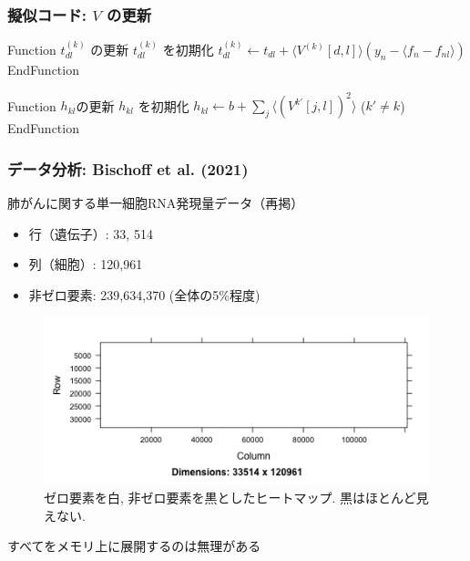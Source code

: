 \documentclass[dvipdfmx, dvipsnames]{beamer}
\begin{document}
\begin{frame} 
\frametitle{擬似コード:  $V$ の更新}

\begin{algorithmic}[1]
\State Function $t_{dl}^{(k)}$ の更新
\State $t_{dl}^{(k)}$ を初期化 
 
    \State $t_{dl}^{(k)} \leftarrow t_{dl} + \langle V^{(k)}[d,l] \rangle (y_n - \langle f_n - f_{nl}\rangle)$ 
\EndFor
   \State EndFunction
\end{algorithmic}

\vfill

\begin{algorithmic}[1]
\State Function $h_{kl}$の更新
\State $h_{kl}$ を初期化 
    \State $h_{kl}  \leftarrow  b +\sum_j \langle (V^{k'}[j, l])^2 \rangle $ ($k' \neq k$) 
  \State EndFunction
\end{algorithmic}

\end{frame}

\begin{frame}
\frametitle{データ分析: Bischoff et al. (2021) }

肺がんに関する単一細胞RNA発現量データ（再掲）
\begin{itemize}
\item 行（遺伝子）: 33, 514
\item 列（細胞）: 120,961
\item 非ゼロ要素: 239,634,370 (全体の5\%程度)
\end{itemize}

\begin{figure}
\includegraphics[height=0.3\textheight, clip]{./img/heatmap.png}
\caption{ゼロ要素を白, 非ゼロ要素を黒としたヒートマップ. 黒はほとんど見えない.}
\end{figure}
すべてをメモリ上に展開するのは無理がある
\end{frame}
\end{document}
